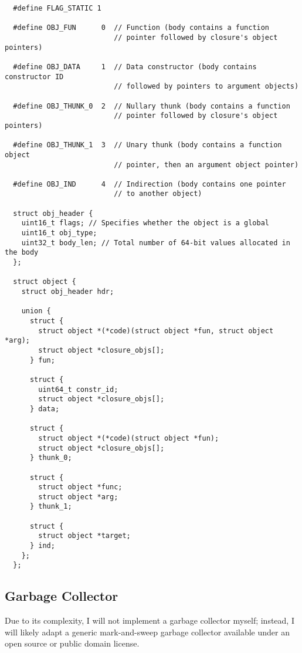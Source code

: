 \documentclass[9pt]{extarticle}
\begin{document}
\begin{verbatim}
  #define FLAG_STATIC 1

  #define OBJ_FUN      0  // Function (body contains a function
                          // pointer followed by closure's object pointers)

  #define OBJ_DATA     1  // Data constructor (body contains constructor ID
                          // followed by pointers to argument objects)

  #define OBJ_THUNK_0  2  // Nullary thunk (body contains a function
                          // pointer followed by closure's object pointers)

  #define OBJ_THUNK_1  3  // Unary thunk (body contains a function object
                          // pointer, then an argument object pointer)

  #define OBJ_IND      4  // Indirection (body contains one pointer
                          // to another object)

  struct obj_header {
    uint16_t flags; // Specifies whether the object is a global
    uint16_t obj_type;
    uint32_t body_len; // Total number of 64-bit values allocated in the body
  };

  struct object {
    struct obj_header hdr;

    union {
      struct {
        struct object *(*code)(struct object *fun, struct object *arg);
        struct object *closure_objs[];
      } fun;

      struct {
        uint64_t constr_id;
        struct object *closure_objs[];
      } data;

      struct {
        struct object *(*code)(struct object *fun);
        struct object *closure_objs[];
      } thunk_0;

      struct {
        struct object *func;
        struct object *arg;
      } thunk_1;

      struct {
        struct object *target;
      } ind;
    };
  };
\end{verbatim}

\subsection{Garbage Collector}

Due to its complexity, I will not implement a garbage collector myself;
instead, I will likely adapt a generic mark-and-sweep garbage collector
available under an open source or public domain license.
\end{document}
